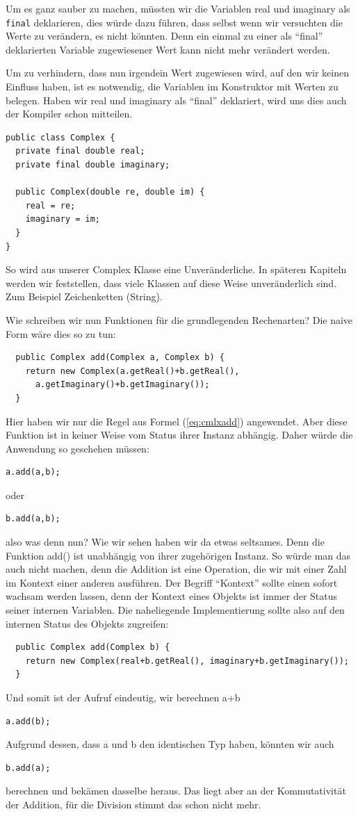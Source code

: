 Um es ganz sauber zu machen, müssten wir die Variablen real und imaginary als \texttt{final} deklarieren, dies würde dazu führen, dass selbst wenn wir versuchten die Werte zu verändern, es nicht könnten. Denn ein einmal zu einer als "`final"' deklarierten Variable zugewiesener Wert kann nicht mehr verändert werden.

Um zu verhindern, dass nun irgendein Wert zugewiesen wird, auf den wir keinen Einfluss haben, ist es notwendig, die Variablen im Konstruktor mit Werten zu belegen. Haben wir real und imaginary als "`final"' deklariert, wird uns dies auch der Kompiler schon mitteilen. 
\begin{lstlisting}
public class Complex {
  private final double real;
  private final double imaginary;
  
  public Complex(double re, double im) {
    real = re;
    imaginary = im;
  }
}
\end{lstlisting}
So wird aus unserer Complex Klasse eine Unveränderliche. In späteren Kapiteln werden wir feststellen, dass viele Klassen auf diese Weise unveränderlich sind. Zum Beispiel Zeichenketten (String).

Wie schreiben wir nun Funktionen für die grundlegenden Rechenarten? Die naive Form wäre dies so zu tun:
\begin{lstlisting}
  public Complex add(Complex a, Complex b) {
    return new Complex(a.getReal()+b.getReal(), 
      a.getImaginary()+b.getImaginary());
  }
\end{lstlisting}
Hier haben wir nur die Regel aus Formel (\ref{eq:cmlxadd}) angewendet. Aber diese Funktion ist in keiner Weise vom Status ihrer Instanz abhängig. Daher würde die Anwendung so geschehen müssen:
\begin{lstlisting}
a.add(a,b);
\end{lstlisting}
oder
\begin{lstlisting}
b.add(a,b);
\end{lstlisting}
also was denn nun? Wie wir sehen haben wir da etwas seltsames. Denn die Funktion add() ist unabhängig von ihrer zugehörigen Instanz. So würde man das auch nicht machen, denn die Addition ist eine Operation, die wir mit einer Zahl im Kontext einer anderen ausführen. Der Begriff "`Kontext"' sollte einen sofort wachsam werden lassen, denn der Kontext eines Objekts ist immer der Status seiner internen Variablen. Die naheliegende Implementierung sollte also auf den internen Status des Objekts zugreifen:
\begin{lstlisting}
  public Complex add(Complex b) {
    return new Complex(real+b.getReal(), imaginary+b.getImaginary());
  }
\end{lstlisting}
Und somit ist der Aufruf eindeutig, wir berechnen a+b
\begin{lstlisting}
a.add(b);
\end{lstlisting}
Aufgrund dessen, dass a und b den identischen Typ haben, könnten wir auch 
\begin{lstlisting}
b.add(a);
\end{lstlisting}
berechnen und bekämen dasselbe heraus. Das liegt aber an der Kommutativität der Addition, für die Division stimmt das schon nicht mehr.

